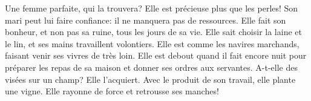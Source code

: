 Une femme parfaite, qui la trouvera?
	Elle est précieuse plus que les perles!
Son mari peut lui faire confiance: il ne manquera pas de ressources.
	Elle fait son bonheur, et non pas sa ruine, tous les jours de sa vie.
Elle sait choisir la laine et le lin, et ses mains travaillent volontiers.
	Elle est comme les navires marchands, faisant venir ses vivres de très loin.
Elle est debout quand il fait encore nuit
	pour préparer les repas de sa maison et donner ses ordres aux servantes.
A-t-elle des visées sur un champ?
	Elle l’acquiert.
Avec le produit de son travail, elle plante une vigne.
	Elle rayonne de force et retrousse ses manches!

